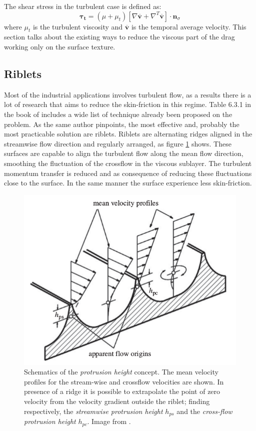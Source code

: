 The shear stress in the turbulent case is defined as:
\begin{equation}
\boldsymbol{\tau_t} =  (\mu + \mu_t)\left[ \nabla \mathbf{\overline{v}} +  \nabla^T  \mathbf{\overline{v}} \right] \cdot  \mathbf{n}_{\sigma}
\end{equation}
where $\mu_t$ is the turbulent viscosity and $\mathbf{\overline{v}}$ is the temporal average velocity.
This section talks about the existing ways to reduce the viscous part of the drag working only on the surface texture.

\subsection{Riblets}
Most of the industrial applications involves turbulent flow, as a results there is a lot of research that aims to reduce the skin-friction in this regime.
Table 6.3.1 in the book of \citet{mclean2012understanding} includes a wide list of technique already been proposed on the problem.
As the same author pinpoints, the most effective and, probably the most practicable solution are riblets.
Riblets are alternating ridges aligned in the streamwise flow direction and regularly arranged, as figure \ref{fig:riblets1} shows.
These surfaces are capable to align the turbulent flow along the mean flow direction, smoothing the fluctuation of the crossflow in the viscous sublayer.
The turbulent momentum transfer is reduced and as consequence of reducing these fluctuations close to the surface. In the same manner the surface experience less skin-friction.

\begin{figure}[h]
	\centering
	\includegraphics[width=0.7\linewidth]{chapter_1/riblets3}
	\caption{Schematics of the  \textit{protrusion height} concept. The mean velocity profiles for the stream-wise and crossflow velocities are shown. In presence of a ridge it is possible to extrapolate the point of zero velocity from the velocity gradient outside the riblet; finding respectively, the \textit{streamwise protrusion height} $h_{ps}$ and the \textit{cross-flow protrusion height} $h_{pc}$. Image from \citet{bechert1997experiments}.}
	\label{fig:riblets1}
\end{figure}

